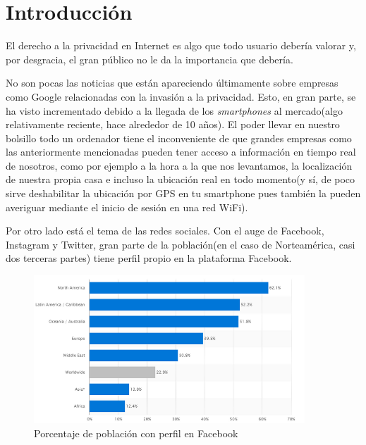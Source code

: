 \chapter{Introducción} 
\label{chap:intro}

\vspace{-0.2cm}


El derecho a la privacidad en Internet es algo que todo usuario debería valorar y, por desgracia, el gran público no le da la importancia que debería. ~\cite{book:PrivacyBigDataPublicGood}

No son pocas las noticias que están apareciendo últimamente sobre empresas como Google relacionadas con la invasión a la privacidad. Esto, en gran parte, se ha visto incrementado debido a la llegada de los \textit{smartphones} al mercado(algo relativamente reciente, hace alrededor de 10 años). El poder llevar en nuestro bolsillo todo un ordenador tiene el inconveniente de que grandes empresas como las anteriormente mencionadas pueden tener acceso a información en tiempo real de nosotros, como por ejemplo a la hora a la que nos levantamos, la localización de nuestra propia casa e incluso la ubicación real en todo momento(y sí, de poco sirve deshabilitar la ubicación por GPS en tu smartphone pues también la pueden averiguar mediante el inicio de sesión en una red WiFi).

Por otro lado está el tema de las redes sociales. Con el auge de Facebook, Instagram y Twitter, gran parte de la población(en el caso de Norteamérica, casi dos terceras partes) tiene perfil propio en la plataforma Facebook.

\begin{figure}[h]
	\centerline{
		\mbox{\includegraphics[width=4.00in]{images/sn.png}}
	}
	\caption{Porcentaje de población con perfil en Facebook~\cite{article:FacebookStats} }
	\label{fig:norm_Daugman}
\end{figure}

